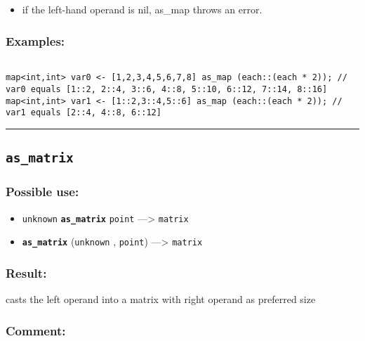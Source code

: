 \documentclass[]{book}
\providecommand{\tightlist}{%
  \setlength{\itemsep}{0pt}\setlength{\parskip}{0pt}}
\theoremstyle{definition}
\theoremstyle{definition}
\theoremstyle{definition}
\theoremstyle{remark}
\begin{document}
\begin{itemize}
\tightlist
\item
  if the left-hand operand is nil, as\_map throws an error.
\end{itemize}

\subsubsection{Examples:}\label{examples-43}

\begin{verbatim}
 
map<int,int> var0 <- [1,2,3,4,5,6,7,8] as_map (each::(each * 2)); // var0 equals [1::2, 2::4, 3::6, 4::8, 5::10, 6::12, 7::14, 8::16] 
map<int,int> var1 <- [1::2,3::4,5::6] as_map (each::(each * 2)); // var1 equals [2::4, 4::8, 6::12] 
\end{verbatim}

\begin{center}\rule{0.5\linewidth}{\linethickness}\end{center}

\subsection{\texorpdfstring{\texttt{as\_matrix}}{as\_matrix}}\label{as_matrix}

\subsubsection{Possible use:}\label{possible-use-53}

\begin{itemize}
\tightlist
\item
  \texttt{unknown} \textbf{\texttt{as\_matrix}} \texttt{point}
  ---\textgreater{} \texttt{matrix}
\item
  \textbf{\texttt{as\_matrix}} (\texttt{unknown} , \texttt{point})
  ---\textgreater{} \texttt{matrix}
\end{itemize}

\subsubsection{Result:}\label{result-52}

casts the left operand into a matrix with right operand as preferred
size

\subsubsection{Comment:}\label{comment-12}
\end{document}
